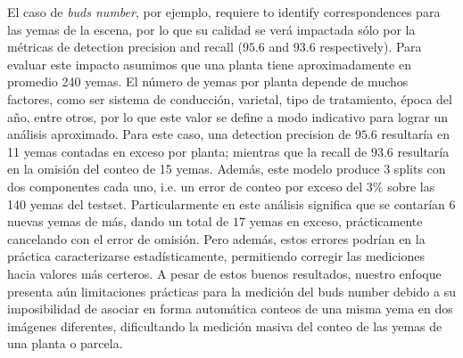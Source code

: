 \documentclass[a4paper,authoryear,review]{elsarticle}
\begin{document}
	
	El caso de \emph{buds number}, por ejemplo, requiere to identify correspondences para las yemas de la escena, por lo que su calidad se verá impactada sólo por la métricas de detection precision and recall ($95.6$ and $93.6$ respectively). Para evaluar este impacto asumimos que una planta tiene aproximadamente en promedio 240 yemas. El número de yemas por planta depende de muchos factores, como ser sistema de conducción, varietal, tipo de tratamiento, época del año, entre otros, por lo que este valor se define a modo indicativo para lograr un análisis aproximado. Para este caso, una detection precision de $95.6$ resultaría en 11 yemas contadas en exceso por planta; mientras que la recall de $93.6$ resultaría en la omisión del conteo de 15 yemas. 
	Además, este modelo produce 3 splits con dos componentes cada uno, i.e. un error de conteo por exceso del $3\%$ sobre las 140 yemas del testset. Particularmente en este análisis significa que se contarían $6$ nuevas yemas de más, dando un total de $17$ yemas en exceso, prácticamente cancelando con el error de omisión. Pero además, estos errores podrían en la práctica caracterizarse estadísticamente, permitiendo corregir las mediciones hacia valores más certeros. 
	A pesar de estos buenos resultados, nuestro enfoque presenta aún limitaciones  prácticas para la medición del buds number debido a su imposibilidad de asociar en forma automática conteos de una misma yema en dos imágenes diferentes, dificultando  la medición masiva del conteo de las yemas de una planta o parcela. 
	
\end{document}
